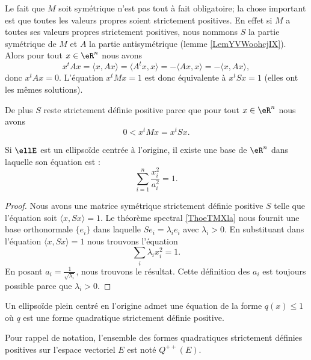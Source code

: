 \begin{remark}
    Le fait que \( M\) soit symétrique n'est pas tout à fait obligatoire; la chose important est que toutes les valeurs propres soient strictement positives. En effet si \( M\) a toutes ses valeurs propres strictement positives, nous nommons \( S\) la partie symétrique de \( M\) et \( A\) la partie antisymétrique (lemme \ref{LemYVWoohcjIX}). Alors pour tout \( x\in \eR^n\) nous avons
    \begin{equation}
        x^tAx=\langle x, Ax\rangle =\langle A^tx,x \rangle =-\langle Ax, x\rangle =-\langle x,Ax\rangle ,
    \end{equation}
    donc \( x^tAx=0\). L'équation \( x^tMx=1\) est donc équivalente à \( x^tSx=1\) (elles ont les mêmes solutions).
    
    De plus \( S\) reste strictement définie positive parce que pour tout \( x\in \eR^n\) nous avons 
    \begin{equation}
        0<x^tMx=x^tSx.
    \end{equation}
\end{remark}

\begin{proposition}\label{PropWDRooQdJiIr}
    Si \( \ellE\) est un ellipsoïde centrée à l'origine, il existe une base de \( \eR^n\) dans laquelle son équation est :
    \begin{equation}
        \sum_{i=1}^n\frac{ x_i^2 }{ a_i^2 }=1.
    \end{equation}
\end{proposition}

\begin{proof}
    Nous avons une matrice symétrique strictement définie positive \( S\) telle que l'équation soit \( \langle x, Sx\rangle =1\). Le théorème spectral \ref{ThoeTMXla} nous fournit une base orthonormale \( \{ e_i \}\) dans laquelle \( Se_i=\lambda_ie_i\) avec \( \lambda_i>0\). En substituant dans l'équation \( \langle x, Sx\rangle =1\) nous trouvons l'équation
    \begin{equation}
        \sum_i\lambda_ix_i^2=1.
    \end{equation}
    En posant \( a_i=\frac{1}{ \sqrt{\lambda_i} }\), nous trouvons le résultat.  Cette définition des \( a_i\) est toujours possible parce que \( \lambda_i>0\).
\end{proof}

\begin{corollary}   \label{CorKGJooOmcBzh}
    Un ellipsoïde plein centré en l'origine admet une équation de la forme \( q(x)\leq 1\) où \( q\) est une forme quadratique strictement définie positive.
\end{corollary}
Pour rappel de notation, l'ensemble des formes quadratiques strictement définies positives sur l'espace vectoriel \( E\) est noté \( Q^{++}(E)\).

